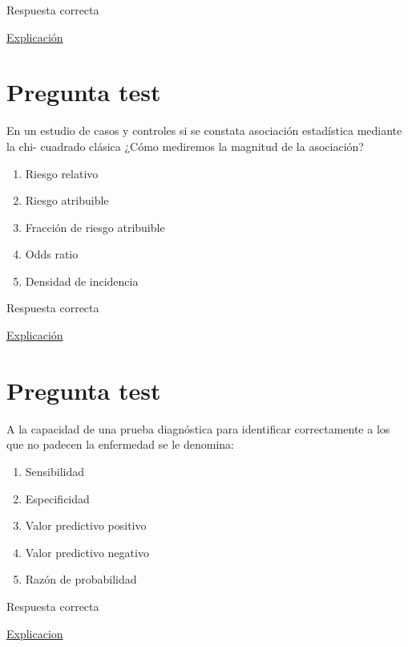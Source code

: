 \documentclass[
]{book}
\providecommand{\tightlist}{%
  \setlength{\itemsep}{0pt}\setlength{\parskip}{0pt}}
\begin{document}
Respuesta correcta

\href{https://es.wikipedia.org/wiki/Riesgo_relativo}{Explicación}

\hypertarget{pregunta-test-151}{%
\section{Pregunta test}\label{pregunta-test-151}}

En un estudio de casos y controles si se constata asociación estadística mediante la chi- cuadrado clásica ¿Cómo mediremos la magnitud de la asociación?

\begin{enumerate}
\def\labelenumi{\alph{enumi})}
\tightlist
\item
  Riesgo relativo
\item
  Riesgo atribuible
\item
  Fracción de riesgo atribuible
\item
  Odds ratio
\item
  Densidad de incidencia
\end{enumerate}

Respuesta correcta

\href{https://www.elsevier.es/es-revista-educacion-medica-71-articulo-el-odds-ratio-su-interpretacion-S1575181317300360}{Explicación}

\hypertarget{pregunta-test-152}{%
\section{Pregunta test}\label{pregunta-test-152}}

A la capacidad de una prueba diagnóstica para identificar correctamente a los que no padecen la enfermedad se le denomina:

\begin{enumerate}
\def\labelenumi{\alph{enumi})}
\tightlist
\item
  Sensibilidad
\item
  Especificidad
\item
  Valor predictivo positivo
\item
  Valor predictivo negativo
\item
  Razón de probabilidad
\end{enumerate}

Respuesta correcta

\href{https://1fjmanzano.github.io/bioestadistica/relaci\%C3\%B3n-entre-variables-cualitativas.html\#diagno\%CC\%81stico-cli\%CC\%81nico}{Explicacion}
\end{document}
